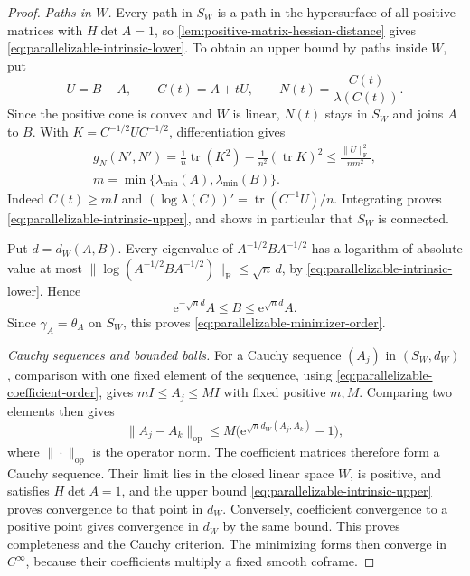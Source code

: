 \begin{proof}
\emph{Paths in $W$.}
Every path in $S_W$ is a path in the hypersurface of all positive matrices with $H\det A=1$, so \cref{lem:positive-matrix-hessian-distance} gives \eqref{eq:parallelizable-intrinsic-lower}. To obtain an upper bound by paths inside $W$, put
\[
 U=B-A,\qquad C(t)=A+tU,\qquad N(t)=\frac{C(t)}{\lambda(C(t))}.
\]
Since the positive cone is convex and $W$ is linear, $N(t)$ stays in $S_W$ and joins $A$ to $B$. With $K=C^{-1/2}UC^{-1/2}$, differentiation gives
\[
 \begin{gathered}
 g_N(N',N')=\frac1n\operatorname{tr}(K^2)
                 -\frac1{n^2}(\operatorname{tr}K)^2
 \leq\frac{\|U\|_{\mathrm F}^2}{nm^2},\\
 m=\min\{\lambda_{\min}(A),\lambda_{\min}(B)\}.
 \end{gathered}
\]
Indeed $C(t)\geq mI$ and $(\log\lambda(C))'=\operatorname{tr}(C^{-1}U)/n$. Integrating proves \eqref{eq:parallelizable-intrinsic-upper}, and shows in particular that $S_W$ is connected.

Put $d=d_W(A,B)$. Every eigenvalue of $A^{-1/2}BA^{-1/2}$ has a logarithm of absolute value at most $\|\log(A^{-1/2}BA^{-1/2})\|_{\mathrm F}\leq\sqrt n\,d$, by \eqref{eq:parallelizable-intrinsic-lower}. Hence
\begin{equation}\label{eq:parallelizable-coefficient-order}
 \mathrm e^{-\sqrt n d}A\leq B\leq\mathrm e^{\sqrt n d}A.
\end{equation}
Since $\gamma_A=\theta_A$ on $S_W$, this proves \eqref{eq:parallelizable-minimizer-order}.

\emph{Cauchy sequences and bounded balls.}
For a Cauchy sequence $(A_j)$ in $(S_W,d_W)$, comparison with one fixed element of the sequence, using \eqref{eq:parallelizable-coefficient-order}, gives $mI\leq A_j\leq MI$ with fixed positive $m,M$. Comparing two elements then gives
\[
 \|A_j-A_k\|_{\mathrm{op}}
 \leq M\bigl(\mathrm e^{\sqrt n d_W(A_j,A_k)}-1\bigr),
\]
where $\|\cdot\|_{\mathrm{op}}$ is the operator norm. The coefficient matrices therefore form a Cauchy sequence. Their limit lies in the closed linear space $W$, is positive, and satisfies $H\det A=1$, and the upper bound \eqref{eq:parallelizable-intrinsic-upper} proves convergence to that point in $d_W$. Conversely, coefficient convergence to a positive point gives convergence in $d_W$ by the same bound. This proves completeness and the Cauchy criterion. The minimizing forms then converge in $C^\infty$, because their coefficients multiply a fixed smooth coframe.


\end{proof}
